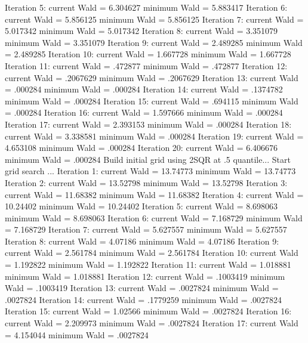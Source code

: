 Iteration     5:  current Wald =  6.304627         minimum Wald =  5.883417
Iteration     6:  current Wald =  5.856125         minimum Wald =  5.856125
Iteration     7:  current Wald =  5.017342         minimum Wald =  5.017342
Iteration     8:  current Wald =  3.351079         minimum Wald =  3.351079
Iteration     9:  current Wald =  2.489285         minimum Wald =  2.489285
Iteration    10:  current Wald =  1.667728         minimum Wald =  1.667728
Iteration    11:  current Wald =   .472877         minimum Wald =   .472877
Iteration    12:  current Wald =  .2067629         minimum Wald =  .2067629
Iteration    13:  current Wald =   .000284         minimum Wald =   .000284
Iteration    14:  current Wald =  .1374782         minimum Wald =   .000284
Iteration    15:  current Wald =   .694115         minimum Wald =   .000284
Iteration    16:  current Wald =  1.597666         minimum Wald =   .000284
Iteration    17:  current Wald =  2.393153         minimum Wald =   .000284
Iteration    18:  current Wald =  3.338581         minimum Wald =   .000284
Iteration    19:  current Wald =  4.653108         minimum Wald =   .000284
Iteration    20:  current Wald =  6.406676         minimum Wald =   .000284
{\smallskip}
Build initial grid using 2SQR at .5 quantile...
{\smallskip}
Start grid search ...
Iteration     1:  current Wald =  13.74773         minimum Wald =  13.74773
Iteration     2:  current Wald =  13.52798         minimum Wald =  13.52798
Iteration     3:  current Wald =  11.68382         minimum Wald =  11.68382
Iteration     4:  current Wald =  10.24402         minimum Wald =  10.24402
Iteration     5:  current Wald =  8.698063         minimum Wald =  8.698063
Iteration     6:  current Wald =  7.168729         minimum Wald =  7.168729
Iteration     7:  current Wald =  5.627557         minimum Wald =  5.627557
Iteration     8:  current Wald =   4.07186         minimum Wald =   4.07186
Iteration     9:  current Wald =  2.561784         minimum Wald =  2.561784
Iteration    10:  current Wald =  1.192822         minimum Wald =  1.192822
Iteration    11:  current Wald =  1.018881         minimum Wald =  1.018881
Iteration    12:  current Wald =  .1003419         minimum Wald =  .1003419
Iteration    13:  current Wald =  .0027824         minimum Wald =  .0027824
Iteration    14:  current Wald =  .1779259         minimum Wald =  .0027824
Iteration    15:  current Wald =   1.02566         minimum Wald =  .0027824
Iteration    16:  current Wald =  2.209973         minimum Wald =  .0027824
Iteration    17:  current Wald =  4.154044         minimum Wald =  .0027824
